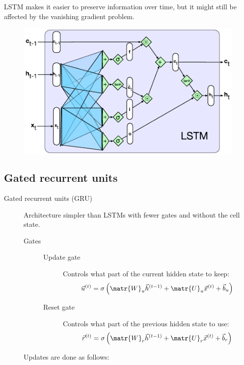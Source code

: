 \begin{description}
        \begin{remark}
            LSTM makes it easier to preserve information over time, but it might still be affected by the vanishing gradient problem.
        \end{remark}

        \begin{figure}[H]
            \centering
            \includegraphics[width=0.5\linewidth]{./img/_lstm.pdf}
        \end{figure}
\end{description}


\subsection{Gated recurrent units}

\begin{description}
    \item[Gated recurrent units (GRU)] 
        Architecture simpler than LSTMs with fewer gates and without the cell state.

        \begin{description}
            \item[Gates] \phantom{}
                \begin{description}
                    \item[Update gate] 
                        Controls what part of the current hidden state to keep:
                        \[ \vec{u}^{(t)} = \sigma\left( \matr{W}_u \vec{h}^{(t-1)} + \matr{U}_u \vec{x}^{(t)} + \vec{b}_u \right) \]
        
                    \item[Reset gate] 
                        Controls what part of the previous hidden state to use:
                        \[ \vec{r}^{(t)} = \sigma\left( \matr{W}_r \vec{h}^{(t-1)} + \matr{U}_r \vec{x}^{(t)} + \vec{b}_r \right) \]
                \end{description}
        \end{description}

        Updates are done as follows:
\end{description}

